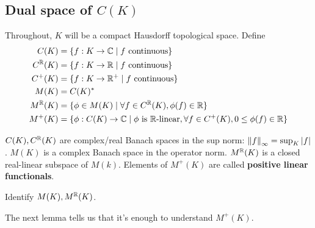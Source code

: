 \documentclass{article}
\begin{document}
\clearpage

\subsection{Dual space of \texorpdfstring{$C(K)$}{C(K)}}

Throughout, $K$ will be a compact Hausdorff topological space. Define
\begin{align*}
  C(K) & = \{f : K \rightarrow \mathbb C \mid f \text{ continuous}\} \\
  C^\mathbb R(K) & = \{f : K \rightarrow \mathbb R \mid f \text{ continuous}\} \\
  C^+(K) & = \{f : K \rightarrow \mathbb R^+ \mid f \text{ continuous}\} \\
  M(K) & = C(K)^* \\
  M^\mathbb R(K) & = \{\phi \in M(K) \mid \forall f \in C^\mathbb R(K), \phi(f) \in \mathbb R\} \\
  M^+(K) & = \{\phi : C(K) \rightarrow \mathbb C \mid \phi \text{ is $\mathbb R$-linear}, \forall f \in C^+(K), 0 \le \phi(f) \in \mathbb R\}
\end{align*}

$C(K), C^\mathbb R(K)$ are complex/real Banach spaces in the sup norm: $\left\lVert f\right\rVert_\infty = \sup_K \left\lvert f\right\rvert$. $M(K)$ is a complex Banach space in the operator norm. $M^\mathbb R(K)$ is a closed real-linear subspace of $M(k)$. Elements of $M^+(K)$ are called {\bf positive linear functionals}.

\begin{aim}
  Identify $M(K), M^\mathbb R(K)$.
\end{aim}

\newlec

The next lemma tells us that it's enough to understand $M^+(K)$.
\end{document}
